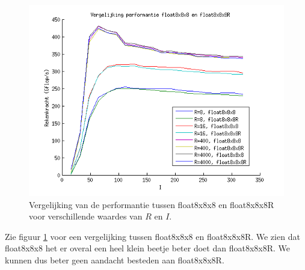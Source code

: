 \begin{figure}[h!]
\centering
\includegraphics{fl8_vs_fl8R}
\caption{\label{fl8_vs_fl8R} Vergelijking van de performantie tussen float8x8x8 en float8x8x8R voor verschillende waardes van $R$ en $I$.}
\end{figure}

Zie figuur \ref{fl8_vs_fl8R} voor een vergelijking tussen float8x8x8 en float8x8x8R. We zien dat float8x8x8 het er overal een heel klein beetje beter doet dan float8x8x8R. We kunnen dus beter geen aandacht besteden aan float8x8x8R.

